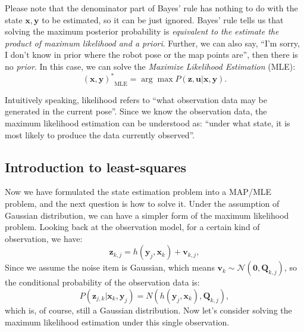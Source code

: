 Please note that the denominator part of Bayes' rule has nothing to do with the state $ \mathbf {x}, \mathbf {y} $ to be estimated, so it can be just ignored. Bayes' rule tells us that solving the maximum posterior probability is \textit {equivalent to the estimate the product of maximum likelihood and a priori}. Further, we can also say, ``I'm sorry, I don't know in prior where the robot pose or the map points are'', then there is no \textit {prior}. In this case, we can solve the \textit {Maximize Likelihood Estimation} (MLE):
\begin{equation}
{ (\mathbf{x},\mathbf{y})^*}_{\mathrm{MLE}} = \arg \max P( \mathbf{z},\mathbf{u}| \mathbf{x},\mathbf{y}).
\end{equation}

Intuitively speaking, likelihood refers to ``what observation data may be generated in the current pose''. Since we know the observation data, the maximum likelihood estimation can be understood as: ``under what state, it is most likely to produce the data currently observed''. 

\subsection{Introduction to least-squares}
Now we have formulated the state estimation problem into a MAP/MLE problem, and the next question is how to solve it. Under the assumption of Gaussian distribution, we can have a simpler form of the maximum likelihood problem. Looking back at the observation model, for a certain kind of observation, we have:
\[
{\mathbf{z}_{k,j}} = h\left( {{ \mathbf{y}_j},{ \mathbf{x}_k}} \right)+ \mathbf{v}_{k, j},
\]
Since we assume the noise item is Gaussian, which means ${\mathbf{v}_k} \sim \mathcal{N}\left( {\mathbf{0},{{{\mathbf{Q}}}_{k,j}}} \right)$, so the conditional probability of the observation data is:
\[
P( \mathbf{z}_{j,k} | \mathbf{x}_k, \mathbf{y}_j) = N\left( h(\mathbf{y}_j, \mathbf{x}_k), \mathbf{Q}_{k,j} \right),
\]
which is, of course, still a Gaussian distribution. Now let's consider solving the maximum likelihood estimation under this single observation.

